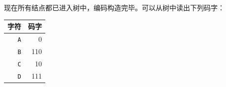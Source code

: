 现在所有结点都已进入树中，编码构造完毕。可以从树中读出下列码字：
\begin{center}
\begin{tabular}{rr}
字符 & 码字 \\
\hline
\texttt{A} & 0 \\
\texttt{B} & 110 \\
\texttt{C} & 10 \\
\texttt{D} & 111 \\
\end{tabular}
\end{center}
